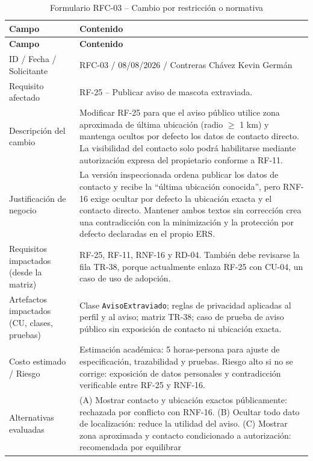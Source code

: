 \documentclass[journal,onecolumn]{IEEEtran}
\begin{document}
	\begin{longtable}{L{4.0cm} L{9.5cm}}
		\caption{Formulario RFC-03 -- Cambio por restricción o normativa}\label{tab:rfc03}\\
		\toprule
		\textbf{Campo} & \textbf{Contenido} \\
		\midrule
		\endfirsthead
		\toprule
		\textbf{Campo} & \textbf{Contenido} \\
		\midrule
		\endhead
		\bottomrule
		\endfoot
		ID / Fecha / Solicitante &
		RFC-03 / 08/08/2026 / Contreras Chávez Kevin Germán \\
		\addlinespace
		Requisito afectado & RF-25 -- Publicar aviso de mascota extraviada. \\
		\addlinespace
		Descripción del cambio &
		Modificar RF-25 para que el aviso público utilice zona aproximada de última ubicación
		(radio $\geq$ 1 km) y mantenga ocultos por defecto los datos de contacto directo. La
		visibilidad del contacto solo podrá habilitarse mediante autorización expresa del propietario
		conforme a RF-11. \\
		\addlinespace
		Justificación de negocio &
		La versión inspeccionada ordena publicar los datos de contacto y recibe la ``última ubicación
		conocida'', pero RNF-16 exige ocultar por defecto la ubicación exacta y el contacto directo.
		Mantener ambos textos sin corrección crea una contradicción con la minimización y la
		protección por defecto declaradas en el propio ERS. \\
		\addlinespace
		Requisitos impactados (desde la matriz) &
		RF-25, RF-11, RNF-16 y RD-04. También debe revisarse la fila TR-38, porque actualmente enlaza
		RF-25 con CU-04, un caso de uso de adopción. \\
		\addlinespace
		Artefactos impactados (CU, clases, pruebas) &
		Clase \texttt{AvisoExtraviado}; reglas de privacidad aplicadas al perfil y al aviso; matriz
		TR-38; caso de prueba de aviso público sin exposición de contacto ni ubicación exacta. \\
		\addlinespace
		Costo estimado / Riesgo &
		Estimación académica: 5 horas-persona para ajuste de especificación, trazabilidad y pruebas.
		Riesgo alto si no se corrige: exposición de datos personales y contradicción verificable entre
		RF-25 y RNF-16. \\
		\addlinespace
		Alternativas evaluadas &
		(A) Mostrar contacto y ubicación exactos públicamente: rechazada por conflicto con RNF-16.
		(B) Ocultar todo dato de localización: reduce la utilidad del aviso.
		(C) Mostrar zona aproximada y contacto condicionado a autorización: recomendada por equilibrar

\end{longtable}
\end{document}
